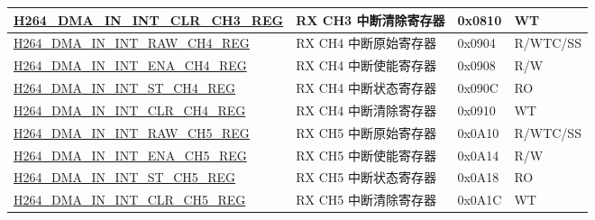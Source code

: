 \begin{longtable}{ | p{7.5cm} | p{5.7cm} | p{1.2cm} | p{1.5cm} | }
    \hyperref[regdesc:H264DMAININTCLRCH3REG]{H264\_DMA\_IN\_INT\_CLR\_CH3\_REG} & RX CH3 中断清除寄存器 & 0x0810 & WT \\ \hline
    \hyperref[regdesc:H264DMAININTRAWCH4REG]{H264\_DMA\_IN\_INT\_RAW\_CH4\_REG} & RX CH4 中断原始寄存器 & 0x0904 & R/WTC/SS \\ \hline
    \hyperref[regdesc:H264DMAININTENACH4REG]{H264\_DMA\_IN\_INT\_ENA\_CH4\_REG} & RX CH4 中断使能寄存器 & 0x0908 & R/W \\ \hline
    \hyperref[regdesc:H264DMAININTSTCH4REG]{H264\_DMA\_IN\_INT\_ST\_CH4\_REG} & RX CH4 中断状态寄存器 & 0x090C & RO \\ \hline
    \hyperref[regdesc:H264DMAININTCLRCH4REG]{H264\_DMA\_IN\_INT\_CLR\_CH4\_REG} & RX CH4 中断清除寄存器 & 0x0910 & WT \\ \hline
    \hyperref[regdesc:H264DMAININTRAWCH5REG]{H264\_DMA\_IN\_INT\_RAW\_CH5\_REG} & RX CH5 中断原始寄存器 & 0x0A10 & R/WTC/SS \\ \hline
    \hyperref[regdesc:H264DMAININTENACH5REG]{H264\_DMA\_IN\_INT\_ENA\_CH5\_REG} & RX CH5 中断使能寄存器 & 0x0A14 & R/W \\ \hline
    \hyperref[regdesc:H264DMAININTSTCH5REG]{H264\_DMA\_IN\_INT\_ST\_CH5\_REG} & RX CH5 中断状态寄存器 & 0x0A18 & RO \\ \hline
    \hyperref[regdesc:H264DMAININTCLRCH5REG]{H264\_DMA\_IN\_INT\_CLR\_CH5\_REG} & RX CH5 中断清除寄存器 & 0x0A1C & WT \\ \hline


\end{longtable}
